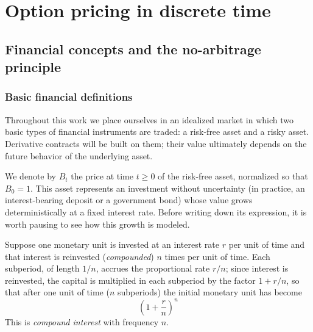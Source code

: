 \documentclass[11pt,a4paper,oneside]{report}
\theoremstyle{plain}
\theoremstyle{definition}
\theoremstyle{remark}
\newcommand{\1}{\mathbf{1}}
\begin{document}
\chapter{Option pricing in discrete time}\label{cap:discreto}

\section{Financial concepts and the no-arbitrage principle}
\label{sec:conceptos_no_arbitraje}

\subsection{Basic financial definitions}
\label{subsec:def_basicas}

Throughout this work we place ourselves in an idealized market in which
two basic types of financial instruments are traded: a risk-free asset
and a risky asset. Derivative contracts will be built on them; their
value ultimately depends on the future behavior of the underlying
asset.

We denote by $B_t$ the price at
time $t \geq 0$ of the risk-free asset, normalized so that $B_0 = 1$.
This asset represents an investment without uncertainty (in practice,
an interest-bearing deposit or a government bond) whose value grows
deterministically at a fixed interest rate. Before writing down its
expression, it is worth pausing to see how this growth is modeled.

Suppose one monetary unit is invested at an interest rate $r$ per unit
of time and that interest is reinvested (\emph{compounded}) $n$ times
per unit of time. Each subperiod, of length $1/n$, accrues the
proportional rate $r/n$; since interest is reinvested, the capital is
multiplied in each subperiod by the factor $1 + r/n$, so that after one
unit of time ($n$ subperiods) the initial monetary unit has become
\begin{equation*}
  \left(1 + \frac{r}{n}\right)^{n}
\end{equation*}
This is \emph{compound interest} with frequency $n$.
\end{document}
